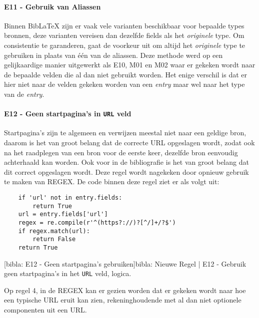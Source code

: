 \paragraph{E11 - Gebruik van Aliassen}
\label{rule:E11-alias-preferences}
Binnen BibLaTeX zijn er vaak vele varianten beschikbaar voor bepaalde types bronnen, deze varianten vereisen dan dezelfde fields als het \emph{originele} type. Om consistentie te garanderen, gaat de voorkeur uit om altijd het \emph{originele} type te gebruiken in plaats van één van de aliassen. Deze methode werd op een gelijkaardige manier uitgewerkt als E10, M01 en M02 waar er gekeken wordt naar de bepaalde velden die al dan niet gebruikt worden. Het enige verschil is dat er hier niet naar de velden gekeken worden van een \emph{entry} maar wel naar het type van de \emph{entry}.
\paragraph{E12 - Geen startpagina's in \texttt{URL} veld}
Startpagina's zijn te algemeen en verwijzen meestal niet naar een geldige bron, daarom is het van groot belang dat de correcte URL opgeslagen wordt, zodat ook na het raadplegen van een bron voor de eerste keer, dezelfde bron eenvoudig achterhaald kan worden. Ook voor in de bibliografie is het van groot belang dat dit correct opgeslagen wordt. Deze regel wordt nagekeken door opnieuw gebruik te maken van \acrshort{REGEX}. De code binnen deze regel ziet er als volgt uit:
\begin{verbatim}
    if 'url' not in entry.fields:
        return True
    url = entry.fields['url']
    regex = re.compile(r'^(https?://)?[^/]+/?$')
    if regex.match(url):
        return False
    return True
\end{verbatim}
[bibla: E12 - Geen startpagina's gebruiken]{bibla: Nieuwe Regel | E12 - Gebruik geen startpagina's in het \texttt{URL} veld, logica. \label{lst:bibla_NR_E12}}

Op regel 4, in de \acrshort{REGEX} kan er gezien worden dat er gekeken wordt naar hoe een typische URL eruit kan zien, rekeninghoudende met al dan niet optionele componenten uit een URL.

